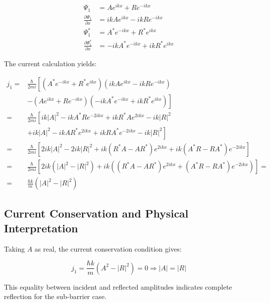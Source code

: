 \documentclass[italian]{HKNdocument}
\begin{document}
\begin{align}
\Psi_{1} & =A e^{i k x}+R e^{-i k x} \\
\frac{\partial \Psi_{1}}{\partial x} & =i k A e^{i k x}-i k R e^{-i k x}  \label{eq:6.47}\\
\Psi_{1}^{*} & =A^{*} e^{-i k x}+R^{*} e^{i k x} \\
\frac{\partial \Psi_{1}^{*}}{\partial x} & =-i k A^{*} e^{-i k x}+i k R^{*} e^{i k x}
\end{align}

The current calculation yields:

\begin{align}
j_{1}= & \frac{\hbar}{2 m i}\left[\left(A^{*} e^{-i k x}+R^{*} e^{i k x}\right)\left(i k A e^{i k x}-i k R e^{-i k x}\right)\right. \\
& \left.-\left(A e^{i k x}+R e^{-i k x}\right)\left(-i k A^{*} e^{-i k x}+i k R^{*} e^{i k x}\right)\right] \\
= & \frac{\hbar}{2 m i}\left[i k|A|^{2}-i k A^{*} R e^{-2 i k x}+i k R^{*} A e^{2 i k x}-i k|R|^{2}\right. \\
& \left.+i k|A|^{2}-i k A R^{*} e^{2 i k x}+i k R A^{*} e^{-2 i k x}-i k|R|^{2}\right] \\
= & \frac{\hbar}{2 m i}\left[2 i k|A|^{2}-2 i k|R|^{2}+i k\left(R^{*} A-A R^{*}\right) e^{2 i k x}+i k\left(A^{*} R-R A^{*}\right) e^{-2 i k x}\right] \\
= & \frac{\hbar}{2 m i}\left[2 i k\left(|A|^{2}-|R|^{2}\right)+i k\left(\left(R^{*} A-A R^{*}\right) e^{2 i k x}+\left(A^{*} R-R A^{*}\right) e^{-2 i k x}\right)\right]= \\
= & \frac{\hbar k}{m}\left(|A|^{2}-|R|^{2}\right) \label{eq:6.48}
\end{align}


\subsection{Current Conservation and Physical Interpretation}

Taking $A$ as real, the current conservation condition gives:

\begin{equation}
j_{1}=\frac{\hbar k}{m}\left(A^{2}-|R|^{2}\right)=0 \Longrightarrow|A|=|R| \label{eq:6.49}
\end{equation}

This equality between incident and reflected amplitudes indicates complete reflection for the sub-barrier case.
\end{document}
